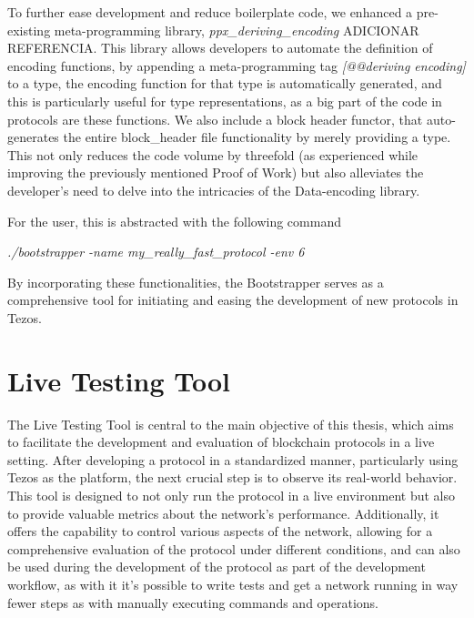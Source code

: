 To further ease development and reduce boilerplate code, we enhanced a pre-existing meta-programming library, \textit{ppx\_deriving\_encoding} ADICIONAR REFERENCIA. 
This library allows developers to automate the definition of encoding functions, by appending a meta-programming tag \textit{[@@deriving encoding]} to a type, the encoding function for that type is automatically generated, and this is particularly useful for type representations, as a big part of the code in protocols are these functions.
We also include a block header functor, that auto-generates the entire block\_header file functionality by merely providing a type.
This not only reduces the code volume by threefold (as experienced while improving the previously mentioned Proof of Work) but also alleviates the developer's need to delve into the intricacies of the Data-encoding library.

For the user, this is abstracted with the following command

\textit{./bootstrapper -name my\_really\_fast\_protocol -env 6}





By incorporating these functionalities, the Bootstrapper serves as a comprehensive tool for initiating and easing the development of new protocols in Tezos.





\section{Live Testing Tool}

The Live Testing Tool is central to the main objective of this thesis, which aims to facilitate the development and evaluation of blockchain protocols in a live setting. After developing a protocol in a standardized manner, particularly using Tezos as the platform, the next crucial step is to observe its real-world behavior. This tool is designed to not only run the protocol in a live environment but also to provide valuable metrics about the network's performance. Additionally, it offers the capability to control various aspects of the network, allowing for a comprehensive evaluation of the protocol under different conditions, and can also be used during the development of the protocol as part of the development workflow, as with it it's possible to write tests and get a network running in way fewer steps as with manually executing commands and operations.

